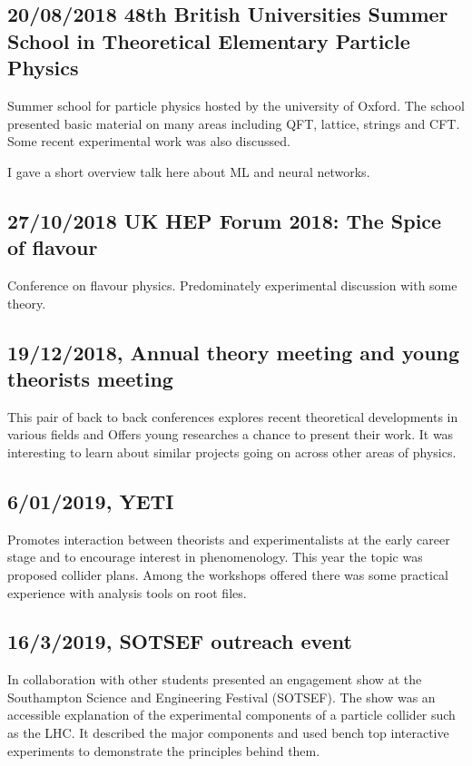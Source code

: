 \tocless\subsection{20/08/2018 48th British Universities Summer School in Theoretical Elementary Particle Physics}
Summer school for particle physics hosted by the university of Oxford. 
The school presented basic material on many areas including QFT, lattice, strings and CFT.
Some recent experimental work was also discussed.

I gave a short overview talk here about ML and neural networks.

\tocless\subsection{27/10/2018 UK HEP Forum 2018: The Spice of flavour}
Conference on flavour physics. Predominately experimental discussion with some theory.

\tocless\subsection{19/12/2018, Annual theory meeting and young theorists meeting}
This pair of back to back conferences explores recent theoretical developments in various fields and
Offers young researches a chance to present their work.
It was interesting to learn about similar projects going on across other areas of physics.

\tocless\subsection{6/01/2019, YETI}
 Promotes interaction between theorists and experimentalists at the early career stage and to encourage interest in phenomenology.
 This year the topic was proposed collider plans.
 Among the workshops offered there was some practical experience with analysis tools on root files.

 \tocless\subsection{16/3/2019, SOTSEF outreach event}
 In collaboration with other students presented an engagement show at the Southampton Science and Engineering Festival (SOTSEF).
 The show was an accessible explanation of the experimental components of a particle collider such as the LHC.
 It described the major components and used bench top interactive experiments to demonstrate the principles behind them.

